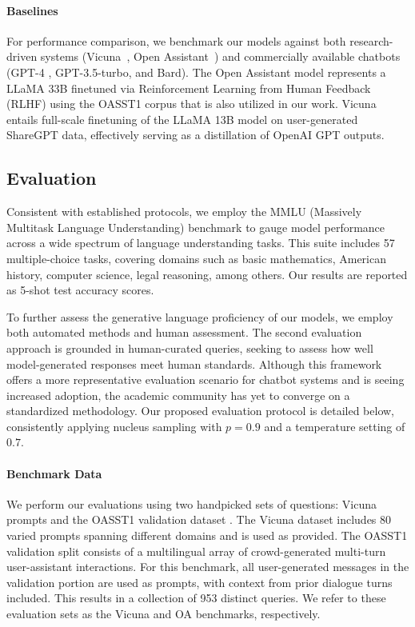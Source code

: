 \paragraph{Baselines} For performance comparison, we benchmark our models against both research-driven systems (Vicuna~\citep{vicuna2023}, Open Assistant~\citep{kopf2023openassistant}) and commercially available chatbots (GPT-4 \citep{openai2023gpt}, GPT-3.5-turbo, and Bard). The Open Assistant model represents a LLaMA 33B finetuned via Reinforcement Learning from Human Feedback (RLHF) using the OASST1 corpus that is also utilized in our work. Vicuna entails full-scale finetuning of the LLaMA 13B model on user-generated ShareGPT data, effectively serving as a distillation of OpenAI GPT outputs.

\subsection{Evaluation}

Consistent with established protocols, we employ the MMLU (Massively Multitask Language Understanding) benchmark \citep{hendrycksmeasuring} to gauge model performance across a wide spectrum of language understanding tasks. This suite includes 57 multiple-choice tasks, covering domains such as basic mathematics, American history, computer science, legal reasoning, among others. Our results are reported as 5-shot test accuracy scores.

To further assess the generative language proficiency of our models, we employ both automated methods and human assessment. The second evaluation approach is grounded in human-curated queries, seeking to assess how well model-generated responses meet human standards. Although this framework offers a more representative evaluation scenario for chatbot systems and is seeing increased adoption, the academic community has yet to converge on a standardized methodology. Our proposed evaluation protocol is detailed below, consistently applying nucleus sampling with $p=0.9$ and a temperature setting of $0.7$.

\paragraph{Benchmark Data} We perform our evaluations using two handpicked sets of questions: Vicuna prompts \citep{vicuna2023} and the OASST1 validation dataset \citep{kopf2023openassistant}. The Vicuna dataset includes 80 varied prompts spanning different domains and is used as provided. The OASST1 validation split consists of a multilingual array of crowd-generated multi-turn user-assistant interactions. For this benchmark, all user-generated messages in the validation portion are used as prompts, with context from prior dialogue turns included. This results in a collection of 953 distinct queries. We refer to these evaluation sets as the Vicuna and OA benchmarks, respectively.

